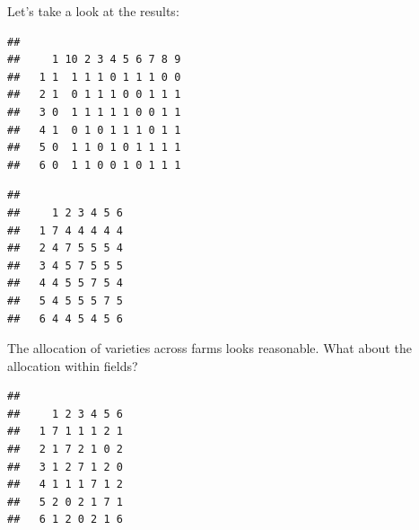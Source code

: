 \documentclass[
]{book}
\newenvironment{Shaded}{\begin{snugshade}}{\end{snugshade}}
\newcommand{\FunctionTok}[1]{\textcolor[rgb]{0.00,0.00,0.00}{#1}}
\newcommand{\NormalTok}[1]{#1}
\newcommand{\SpecialCharTok}[1]{\textcolor[rgb]{0.00,0.00,0.00}{#1}}
\begin{document}
Let's take a look at the results:

\begin{Shaded}
\end{Shaded}

\begin{verbatim}
##    
##     1 10 2 3 4 5 6 7 8 9
##   1 1  1 1 1 0 1 1 1 0 0
##   2 1  0 1 1 1 0 0 1 1 1
##   3 0  1 1 1 1 1 0 0 1 1
##   4 1  0 1 0 1 1 1 0 1 1
##   5 0  1 1 0 1 0 1 1 1 1
##   6 0  1 1 0 0 1 0 1 1 1
\end{verbatim}

\begin{Shaded}
\end{Shaded}

\begin{verbatim}
##    
##     1 2 3 4 5 6
##   1 7 4 4 4 4 4
##   2 4 7 5 5 5 4
##   3 4 5 7 5 5 5
##   4 4 5 5 7 5 4
##   5 4 5 5 5 7 5
##   6 4 4 5 4 5 6
\end{verbatim}

The allocation of varieties across farms looks reasonable. What about the allocation within fields?

\begin{Shaded}
\end{Shaded}

\begin{verbatim}
##    
##     1 2 3 4 5 6
##   1 7 1 1 1 2 1
##   2 1 7 2 1 0 2
##   3 1 2 7 1 2 0
##   4 1 1 1 7 1 2
##   5 2 0 2 1 7 1
##   6 1 2 0 2 1 6
\end{verbatim}
\end{document}
